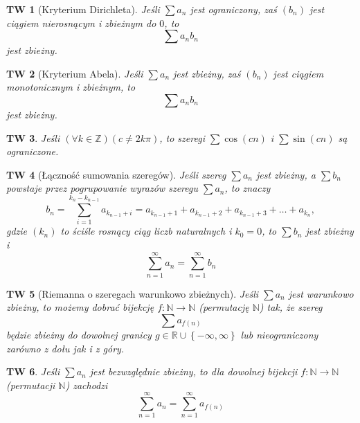 \documentclass[a4paper, 12pt]{mwart}
\theoremstyle{definition}
\theoremstyle{plain}
\newtheorem{twierdzenie}{TW}[section]
\theoremstyle{remark}
\begin{document}
\begin{twierdzenie}[Kryterium Dirichleta]
	Jeśli \emph{$\sum a_n$ jest ograniczony}, zaś $(b_n)$ jest ciągiem \emph{nierosnącym i zbieżnym do $0$}, to
	\begin{equation}
		\sum a_nb_n
	\end{equation}
	jest zbieżny.
\end{twierdzenie}
\begin{twierdzenie}[Kryterium Abela]
	Jeśli \emph{$\sum a_n$ jest zbieżny}, zaś $(b_n)$ jest ciągiem \emph{monotonicznym i zbieżnym}, to
	\begin{equation}
		\sum a_nb_n
	\end{equation}
	jest zbieżny.
\end{twierdzenie}
\begin{twierdzenie}
	Jeśli $(\forall k\in\mathbb{Z})(c\neq2k\pi)$, to szeregi
	$\sum \cos(cn)$ i $\sum \sin(cn)$ są ograniczone.
\end{twierdzenie}
\begin{twierdzenie}[Łączność sumowania szeregów]
	Jeśli szereg $\sum a_n$ jest zbieżny, a $\sum b_n$ powstaje przez pogrupowanie wyrazów szeregu $\sum a_n$, to znaczy
	\begin{equation}
		b_n = \sum_{i=1}^{k_n - k_{n-1}} a_{k_{n-1}+i} = a_{k_{n-1}+1} + a_{k_{n-1}+2} + a_{k_{n-1}+3} + \ldots + a_{k_n},
	\end{equation}
	gdzie $(k_n)$ to ściśle rosnący ciąg liczb naturalnych i $k_0=0$, to $\sum b_n$ jest zbieżny i
	\begin{equation}
		\sum_{n=1}^{\infty} a_n = \sum_{n=1}^{\infty} b_n
	\end{equation}
\end{twierdzenie}
\begin{twierdzenie}[Riemanna o szeregach warunkowo zbieżnych]
	Jeśli $\sum a_n$ jest warunkowo zbieżny, to możemy dobrać bijekcję $f:\mathbb{N}\to\mathbb{N}$ (permutację $\mathbb{N}$) tak, że szereg
	\begin{equation}
		\sum a_{f(n)}
	\end{equation}
	będzie zbieżny do dowolnej granicy $g\in\mathbb{R}\cup \left\{-\infty, \infty\right\}$ lub nieograniczony zarówno z dołu jak i z góry.
\end{twierdzenie}
\begin{twierdzenie}
	Jeśli $\sum a_n$ jest bezwzględnie zbieżny, to dla dowolnej bijekcji $f:\mathbb{N}\to\mathbb{N}$ (permutacji $\mathbb{N}$) zachodzi
	\begin{equation}
		\sum_{n=1}^\infty a_n = \sum_{n=1}^\infty a_{f(n)}
	\end{equation}
\end{twierdzenie}
\end{document}
